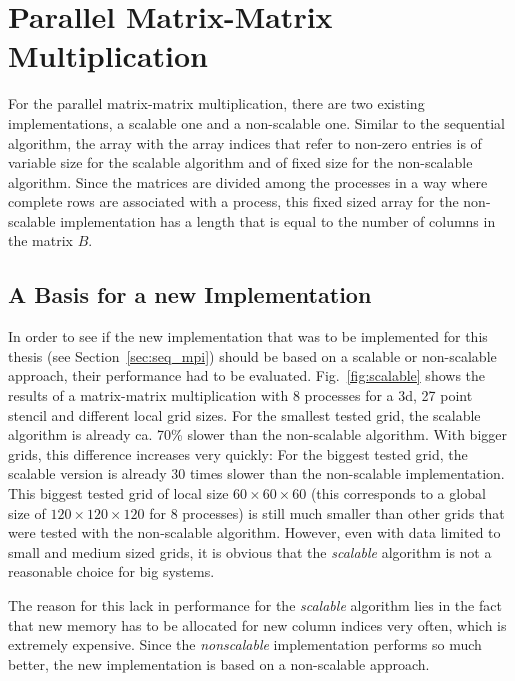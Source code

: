 \section{Parallel Matrix-Matrix Multiplication}
For the parallel matrix-matrix multiplication, there are two existing implementations, a scalable one and a non-scalable one. Similar to the sequential algorithm, the array with the array indices that refer to non-zero entries is of variable size for the scalable algorithm and of fixed size for the non-scalable algorithm. Since the matrices are divided among the processes in a way where complete rows are  associated with a process, this fixed sized array for the non-scalable implementation has a length that is equal to the number of columns in the matrix $B$. 

\subsection{A Basis for a new Implementation}
In order to see if the new implementation that was to be implemented for this thesis (see Section~\ref{sec:seq_mpi}) should be based on a scalable or non-scalable approach, their performance had to be evaluated. Fig.~\ref{fig:scalable} shows the results of a matrix-matrix multiplication with 8 processes for a 3d, 27 point stencil and different local grid sizes. For the smallest tested grid, the scalable algorithm is already ca. 70\% slower than the non-scalable algorithm. With bigger grids, this difference increases very quickly: For the biggest tested grid, the scalable version is already 30 times slower than the non-scalable implementation. This biggest tested grid of local size $60 \times 60 \times 60$ (this corresponds to a global size of $120\times 120 \times 120$ for 8 processes) is still much smaller than other grids that were tested with the non-scalable algorithm. However, even with data limited to small and medium sized grids, it is obvious that the \textit{scalable} algorithm is not a reasonable choice for big systems. 

The reason for this lack in performance for the \textit{scalable} algorithm lies in the fact that new memory has to be allocated for new column indices very often, which is extremely expensive. Since the \textit{nonscalable} implementation performs so much better, the new implementation is based on a non-scalable approach. 

